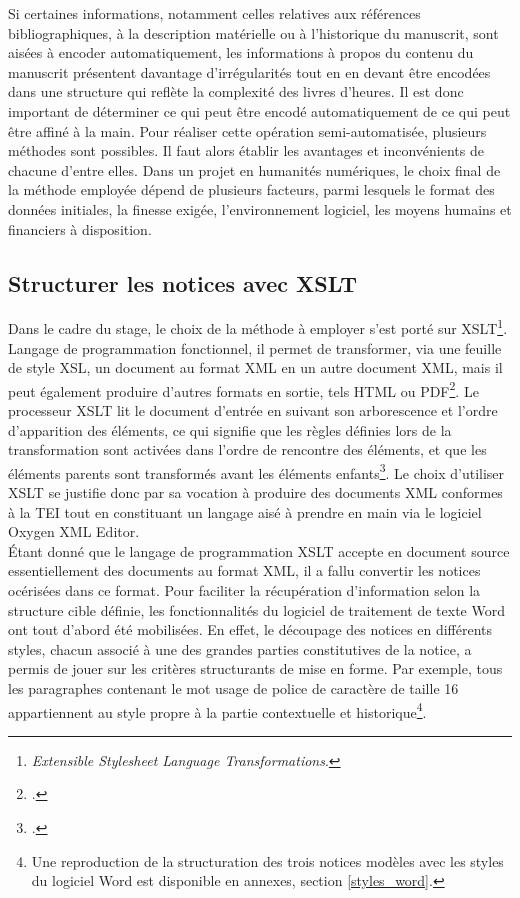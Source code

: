 \documentclass[a4paper,12pt,twoside]{book}
\begin{document}
	Si certaines informations, notamment celles relatives aux références bibliographiques, à la description matérielle ou à l'historique du manuscrit, sont aisées à encoder automatiquement, les informations à propos du contenu du manuscrit présentent davantage d'irrégularités tout en en devant être encodées dans une structure qui reflète la complexité des livres d'heures. Il est donc important de déterminer ce qui peut être encodé automatiquement de ce qui peut être affiné à la main. Pour réaliser cette opération semi-automatisée, plusieurs méthodes sont possibles. Il faut alors établir les avantages et inconvénients de chacune d'entre elles. Dans un projet en humanités numériques, le choix final de la méthode employée dépend de plusieurs facteurs, parmi lesquels le format des données initiales, la finesse exigée, l'environnement logiciel, les moyens humains et financiers à disposition. 
	
	\subsection{Structurer les notices avec XSLT}
	
	Dans le cadre du stage, le choix de la méthode à employer s'est porté sur XSLT\footnote{\textit{Extensible Stylesheet Language Transformations}.}. Langage de programmation fonctionnel, il permet de transformer, via une feuille de style XSL, un document au format XML en un autre document XML, mais il peut également produire d'autres formats en sortie, tels HTML ou PDF\footcite[p. 519]{XML_concentré}. Le processeur XSLT lit le document d'entrée en suivant son arborescence et l'ordre d'apparition des éléments, ce qui signifie que les règles définies lors de la transformation sont activées dans l'ordre de rencontre des éléments, et que les éléments parents sont transformés avant les éléments enfants\footcite[p. 164]{XML_concentré}. Le choix d'utiliser XSLT se justifie donc par sa vocation à produire des documents XML conformes à la TEI tout en constituant un langage aisé à prendre en main via le logiciel Oxygen XML Editor.\\
	
	Étant donné que le langage de programmation XSLT accepte en document source essentiellement des documents au format XML, il a fallu convertir les notices océrisées dans ce format. Pour faciliter la récupération d'information selon la structure cible définie, les fonctionnalités du logiciel de traitement de texte Word ont tout d'abord été mobilisées. En effet, le découpage des notices en différents styles, chacun associé à une des grandes parties constitutives de la notice, a permis de jouer sur les critères structurants de mise en forme. Par exemple, tous les paragraphes contenant le mot \og usage\fg{} de police de caractère de taille 16 appartiennent au style propre à la partie contextuelle et historique\footnote{Une reproduction de la structuration des trois notices modèles avec les styles du logiciel Word est disponible en annexes, section \ref{styles_word}.}. 
	
\end{document}
